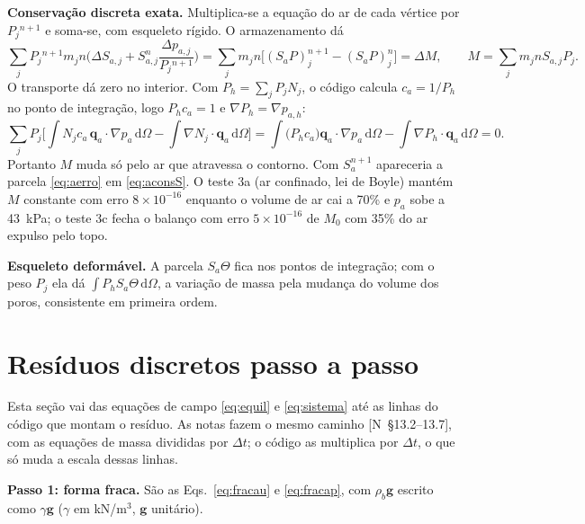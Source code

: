 \documentclass[11pt,a4paper]{article}
\numberwithin{equation}{section}
\newcommand{\dd}{\mathrm{d}}
\newcommand{\pabs}{P}
\newcommand{\nota}[1]{{\footnotesize\textsf{[N~#1]}}}
\begin{document}
\textbf{Conservação discreta exata.} Multiplica-se a equação do ar de cada vértice por $\pabs_j{}^{n+1}$ e soma-se, com
esqueleto rígido. O armazenamento dá
\begin{equation}
\sum_j\pabs_j{}^{n+1}m_jn\Big(\Delta S_{a,j}+S_{a,j}^n\frac{\Delta p_{a,j}}{\pabs_j{}^{n+1}}\Big)
=\sum_jm_jn\big[(S_a\pabs)_j^{n+1}-(S_a\pabs)_j^{n}\big]=\Delta M,\qquad M=\sum_jm_jnS_{a,j}\pabs_j .
\label{eq:aconsS}
\end{equation}
O transporte dá zero no interior. Com $\pabs_h=\sum_j\pabs_jN_j$, o código calcula $c_a=1/\pabs_h$ no ponto de
integração, logo $\pabs_hc_a=1$ e $\nabla\pabs_h=\nabla p_{a,h}$:
\begin{equation}
\sum_j\pabs_j\Big[\int N_jc_a\,\mathbf q_a\cdot\nabla p_a\,\dd\Omega-\int\nabla N_j\cdot\mathbf q_a\,\dd\Omega\Big]
=\int\big(\pabs_hc_a\big)\mathbf q_a\cdot\nabla p_a\,\dd\Omega-\int\nabla\pabs_h\cdot\mathbf q_a\,\dd\Omega=0 .
\label{eq:aconsT}
\end{equation}
Portanto $M$ muda só pelo ar que atravessa o contorno. Com $S_a^{n+1}$ apareceria a parcela \eqref{eq:aerro} em
\eqref{eq:aconsS}. O teste 3a (ar confinado, lei de Boyle) mantém $M$ constante com erro $8\times10^{-16}$ enquanto o
volume de ar cai a 70\% e $p_a$ sobe a 43~kPa; o teste 3c fecha o balanço com erro $5\times10^{-16}$ de $M_0$ com 35\% do
ar expulso pelo topo.

\textbf{Esqueleto deformável.} A parcela $S_a\Theta$ fica nos pontos de integração; com o peso $\pabs_j$ ela dá
$\int\pabs_hS_a\Theta\,\dd\Omega$, a variação de massa pela mudança do volume dos poros, consistente em primeira ordem.


\section{Resíduos discretos passo a passo}\label{sec:residuos}

Esta seção vai das equações de campo \eqref{eq:equil} e \eqref{eq:sistema} até as linhas do código que montam o
resíduo. As notas fazem o mesmo caminho \nota{§13.2--13.7}, com as equações de massa divididas por $\Delta t$; o código
as multiplica por $\Delta t$, o que só muda a escala dessas linhas.

\textbf{Passo 1: forma fraca.} São as Eqs.~\eqref{eq:fracau} e \eqref{eq:fracap}, com $\rho_b\mathbf g$ escrito como
$\gamma\mathbf g$ ($\gamma$ em kN/m$^3$, $\mathbf g$ unitário).
\end{document}
